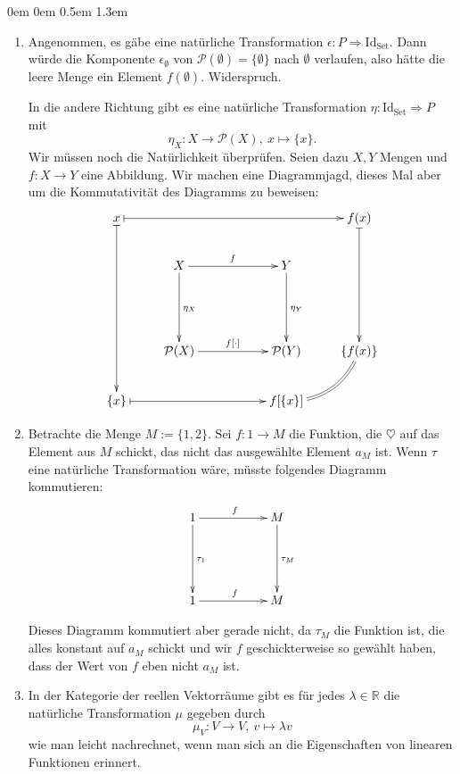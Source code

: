\documentclass[a4paper,ngerman]{scrartcl}
\theoremstyle{definition}
\theoremstyle{plain}
\theoremstyle{remark}
\newcommand{\R}{\mathbb{R}}
\newcommand{\Set}{\mathrm{Set}}
\newcommand{\Id}{\mathrm{Id}}
\newcommand{\Pset}{\mathcal{P}}
\begin{document}
\begin{list}{}{0em \leftmargin0em \itemindent0.5em \itemsep 1.3em}
\begin{enumerate}
\item Angenommen, es gäbe eine natürliche Transformation $\epsilon : P \Rightarrow \Id_{\Set}$. Dann würde die Komponente $\epsilon_{\emptyset}$ von $\Pset(\emptyset) = \{ \emptyset \}$ nach $\emptyset$ verlaufen, also hätte die leere Menge ein Element $f(\emptyset)$. Widerspruch.

In die andere Richtung gibt es eine natürliche Transformation $\eta : \Id_{\Set} \Rightarrow P$ mit
\[ \eta_X : X \to \mathcal{P}(X),\ x \mapsto \{x\}. \]
Wir müssen noch die Natürlichkeit überprüfen. Seien dazu $X, Y$ Mengen und $f : X \to Y$ eine Abbildung. Wir machen eine Diagrammjagd, dieses Mal aber um die Kommutativität des Diagramms zu beweisen:
\[ \xymatrixcolsep{2pc}\xymatrix{
  x  \ar@{|->}[dddd] \ar@{|->}[rrrr] &&&& f(x) \ar@{|->}[ddd] \\
  & X \ar[dd]^{\eta_{X}} \ar[rr]^{f} && Y \ar[dd]^{\eta_{Y}} \\
  \\
  & \Pset(X) \ar[rr]^{f[\cdot]} && \Pset(Y) & \{f(x)\} \ar@{=}@/^1pc/[dl] \\
  \{ x \} \ar@{|->}[rrr] &&& f[\{ x \}]
} \]

\item Betrachte die Menge $M := \{1, 2\}$. Sei $f : 1 \to M$ die Funktion, die
$\heartsuit$ auf das Element aus $M$ schickt, das nicht das ausgewählte Element $a_M$ ist.
Wenn $\tau$ eine natürliche Transformation wäre, müsste folgendes Diagramm kommutieren:
\[ \xymatrixcolsep{2pc}\xymatrix{
  1 \ar[dd]^{\tau_{1}} \ar[rr]^{f} && M \ar[dd]^{\tau_{M}} \\
  \\
  1 \ar[rr]^{f} && M
} \]

Dieses Diagramm kommutiert aber gerade nicht, da $\tau_{M}$ die Funktion ist, die
alles konstant auf $a_M$ schickt und wir $f$ geschickterweise so gewählt haben, dass der Wert von $f$ eben nicht $a_M$ ist.


\item In der Kategorie der reellen Vektorräume gibt es für jedes $\lambda \in \R$ die
natürliche Transformation $\mu$ gegeben durch
\[ \mu_{V} : V \to V,\ v \mapsto \lambda v \]
wie man leicht nachrechnet, wenn man sich an die Eigenschaften von linearen Funktionen
erinnert.


\end{enumerate}
\end{list}
\end{document}
